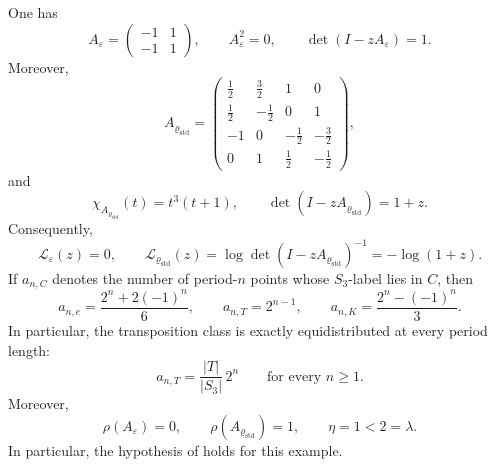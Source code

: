 \begin{proposition}
  \label{prop:s3-example-channels}
  One has
  \begin{equation}\label{eq:s3-example-aeps}
    A_\varepsilon=
    \begin{pmatrix}
      -1 & 1 \\
      -1 & 1
    \end{pmatrix},
    \qquad
    A_\varepsilon^2=0,
    \qquad
    \det(I-zA_\varepsilon)=1.
  \end{equation}
  Moreover,
  \begin{equation}\label{eq:s3-example-arho}
    A_{\varrho_{\mathrm{std}}}=
    \begin{pmatrix}
      \frac12 & \frac32 & 1 & 0 \\
      \frac12 & -\frac12 & 0 & 1 \\
      -1 & 0 & -\frac12 & -\frac32 \\
      0 & 1 & \frac12 & -\frac12
    \end{pmatrix},
  \end{equation}
  and
  \begin{equation}\label{eq:s3-example-arho-charpoly}
    \chi_{A_{\varrho_{\mathrm{std}}}}(t)=t^3(t+1),
    \qquad
    \det(I-zA_{\varrho_{\mathrm{std}}})=1+z.
  \end{equation}
  Consequently,
  \begin{equation}\label{eq:s3-example-logarithms}
    \mathcal L_\varepsilon(z)=0,
    \qquad
    \mathcal L_{\varrho_{\mathrm{std}}}(z)=\log\det(I-zA_{\varrho_{\mathrm{std}}})^{-1}=-\log(1+z).
  \end{equation}
  If \(a_{n,C}\) denotes the number of period-\(n\) points whose
  \(S_3\)-label lies in \(C\), then
  \begin{equation}\label{eq:s3-example-periodic-classes}
    a_{n,e}=\frac{2^n+2(-1)^n}{6},
    \qquad
    a_{n,T}=2^{n-1},
    \qquad
    a_{n,K}=\frac{2^n-(-1)^n}{3}.
  \end{equation}
  In particular, the transposition class is exactly equidistributed at
  every period length:
  \begin{equation}\label{eq:s3-example-periodic-equidistribution}
    a_{n,T}=\frac{|T|}{|S_3|}\,2^n
    \qquad \text{for every } n\ge 1.
  \end{equation}
  Moreover,
  \begin{equation}\label{eq:s3-example-eta-check}
    \rho(A_\varepsilon)=0,
    \qquad
    \rho(A_{\varrho_{\mathrm{std}}})=1,
    \qquad
    \eta=1<2=\lambda.
  \end{equation}
  In particular, the hypothesis of
   holds for this example.
\end{proposition}

